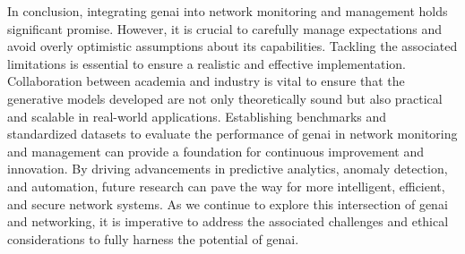 \vspace{5pt}
%
In conclusion, integrating \gls{genai} into network monitoring and management holds significant promise. However, it is crucial to carefully manage expectations and avoid overly optimistic assumptions about its capabilities. Tackling the associated limitations is essential to ensure a realistic and effective implementation.
%
Collaboration between academia and industry is vital to ensure that the generative models developed are not only theoretically sound but also practical and scalable in real-world applications. Establishing benchmarks and standardized datasets to evaluate the performance of \gls{genai} in network monitoring and management can provide a foundation for continuous improvement and innovation.
By driving advancements in predictive analytics, anomaly detection, and automation, future research can pave the way for more intelligent, efficient, and secure network systems. As we continue to explore this intersection of \gls{genai} and networking, it is imperative to address the associated challenges and ethical considerations to fully harness the potential of \gls{genai}.







